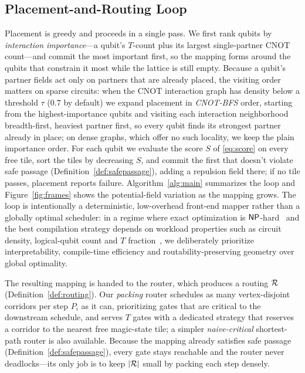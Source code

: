 \subsection{Placement-and-Routing Loop}
\label{sec:loop}

Placement is greedy and proceeds in a single pass. We first rank qubits by
\emph{interaction importance}---a qubit's $T$-count plus its largest single-partner
CNOT count---and commit the most important first, so the mapping forms around the
qubits that constrain it most while the lattice is still empty. Because a qubit's
partner fields act only on partners that are already placed, the visiting order
matters on sparse circuits: when the CNOT interaction graph has density below a
threshold $\tau$ ($0.7$ by default) we expand placement in \emph{CNOT-BFS} order,
starting from the highest-importance qubits and visiting each interaction
neighborhood breadth-first, heaviest partner first, so every qubit finds its
strongest partner already in place; on dense graphs, which offer no such locality,
we keep the plain importance order. For each qubit we evaluate the score $S$ of
\eqref{eq:score} on every free tile, sort the tiles by decreasing $S$, and commit
the first that doesn't violate safe passage
(Definition~\ref{def:safepassage}), adding a repulsion field there; if no tile
passes, placement reports failure.
Algorithm~\ref{alg:main} summarizes the loop and Figure~\ref{fig:frames} shows the potential-field variation as
the mapping grows. The loop is intentionally a deterministic, low-overhead
front-end mapper rather than a globally optimal scheduler: in a regime where exact
optimization is $\mathsf{NP}$-hard~\cite{herr2017nphard} and the best compilation strategy
depends on workload properties such as circuit density, logical-qubit count and
$T$ fraction~\cite{leblond2025comparison}, we deliberately prioritize
interpretability, compile-time efficiency and routability-preserving geometry over
global optimality.



The resulting mapping is handed to the router, which produces a routing
$\mathcal{R}$ (Definition~\ref{def:routing}). Our \emph{packing} router schedules as many
vertex-disjoint corridors per step $P_i$ as it can, prioritizing gates that are
critical to the downstream schedule, and serves $T$ gates with a dedicated
strategy that reserves a corridor to the nearest free magic-state tile; a simpler
\emph{naive-critical} shortest-path router is also available. Because the mapping already
satisfies safe passage (Definition~\ref{def:safepassage}), every gate stays
reachable and the router never deadlocks---its only job is to keep $|\mathcal{R}|$ small
by packing each step densely.

